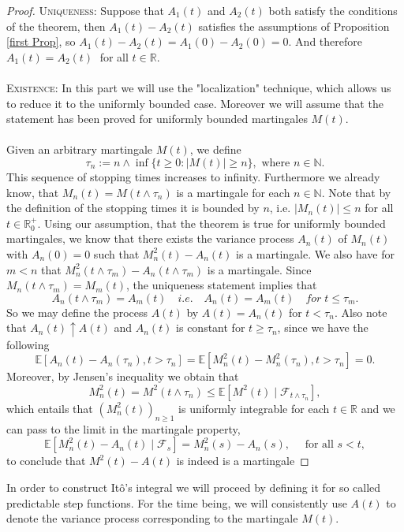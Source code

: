 \documentclass[11pt,a4paper, final]{article}
\begin{document}
\begin{proof}
\textsc{Uniqueness:} Suppose that $A_1(t)$ and $A_2(t)$ both satisfy the conditions of the theorem, then $A_1(t)-A_2(t)$ satisfies the assumptions of Proposition \ref{first Prop}, so $A_1(t)-A_2(t)=A_1(0)-A_2(0)=0$. And therefore $A_1(t)=A_2(t) \;$ for all $t \in \mathbb{R}$. 
\\\\
\textsc{Existence:} In this part we will use the "localization" technique, which allows us to reduce it to the uniformly bounded case. Moreover we will assume that the statement has been proved for uniformly bounded martingales $M(t)$. %
\\\\
Given an arbitrary martingale $M(t)$, we define
$$\tau_n := n \wedge \inf\{t \geq 0: |M(t)|\geq n\}, \text{ where } n \in \mathbb{N}.$$
This sequence of stopping times increases to infinity. Furthermore we already know, that $M_n(t)=M(t \wedge \tau_n)$ is a martingale for each $n \in \mathbb{N}$. Note that by the definition of the stopping times it is bounded by $n$, i.e. $| M_n(t) |\leq n$ for all $t \in \mathbb{R}_0^+$. 
\newpage  
\noindent Using our assumption, that the theorem is true for uniformly bounded martingales, we know that there exists the variance process $A_n(t)$ of $M_n(t)$ with $A_n(0)=0$ such that $M_n^2(t)-A_n(t)$ is a martingale. We also have for $m<n$ that $M_n^2(t \wedge \tau_m)-A_n(t \wedge \tau_m)$ is a martingale. Since $M_n(t \wedge \tau_m)=M_m(t)$, the uniqueness statement implies that 
$$A_n(t \wedge \tau_m)=A_m(t) \quad i.e.\quad  A_n(t)=A_m(t) \quad for \;t\leq \tau_m.$$
So we may define the process $A(t)$ by $A(t)=A_n(t)$ for $t<\tau_n$. Also note that $A_n(t) \uparrow A(t)$ and $A_n(t)$ is constant for $t\geq \tau_n$, since we have the following
$$\mathbb{E}[A_n(t)-A_n(\tau_n), t>\tau_n]= \mathbb{E}[M_n^2(t)-M_n^2(\tau_n), t>\tau_n]=0.$$
Moreover, by Jensen's inequality we obtain that
$$M_n^2(t)=M^2(t \wedge \tau_n) \leq \mathbb{E}[M^2(t) \mid \mathcal{F}_{t \wedge \tau_n}],$$
which entails that $(M_n^2(t))_{n\geq 1}$ is uniformly integrable for each $t \in \mathbb{R}$ and we can pass to the limit in the martingale property,
$$\mathbb{E}[M_n^2(t)-A_n(t) \mid \mathcal{F}_s]=M_n^2(s)-A_n(s), \quad \text{ for all }s<t,$$
to conclude that $M^2(t)-A(t)$ is indeed is a martingale
\end{proof}
\noindent In order to construct Itô's integral we will proceed by defining it for so called predictable step functions. For the time being, we will consistently use $A(t)$ to denote the variance process corresponding to the martingale $M(t)$. 
\end{document}
